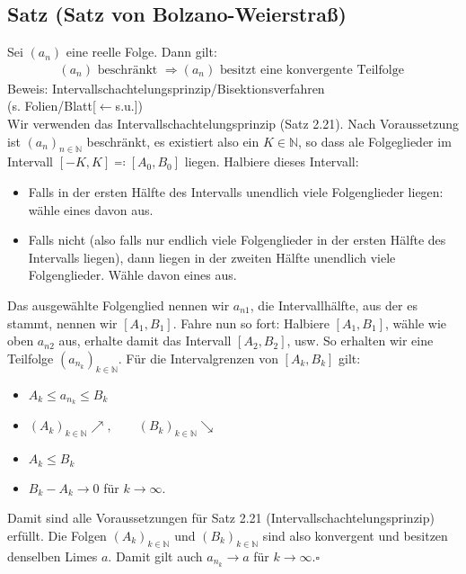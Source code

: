 \documentclass[12pt, titlepage]{article}
\newcommand{\N}{\mathds{N}}
\renewcommand{\>}{\rightarrow}
\renewcommand{\*}{\cdot}
\begin{document}
	\subsection{Satz (Satz von Bolzano-Weierstraß)}
	Sei $(a_n)$ eine reelle Folge. Dann gilt:
	\begin{align*}
		(a_n)\textrm{  beschränkt  }\Rightarrow(a_n)\textrm{  besitzt eine konvergente Teilfolge  }
	\end{align*}
	Beweis: Intervallschachtelungsprinzip/Bisektionsverfahren\\
	(s. Folien/Blatt[$\leftarrow$s.u.])
	\\
	Wir verwenden das Intervallschachtelungsprinzip (Satz 2.21). Nach Voraussetzung ist $(a_n)_{n\in\N}$ beschränkt, es existiert also ein $K\in\N$, so dass ale Folgeglieder im Intervall $[-K,K]\eqqcolon[A_0,B_0]$ liegen. Halbiere dieses Intervall:
	\begin{itemize}
		\item Falls in der ersten Hälfte des Intervalls unendlich viele Folgenglieder liegen: wähle eines davon aus.
		\item Falls nicht (also falls nur endlich viele Folgenglieder in der ersten Hälfte des Intervalls liegen), dann liegen in der zweiten Hälfte unendlich viele Folgenglieder. Wähle davon eines aus.
	\end{itemize}
	Das ausgewählte Folgenglied nennen wir $a_{n1}$, die Intervallhälfte, aus der es stammt, nennen wir $[A_1,B_1]$. Fahre nun so fort: Halbiere $[A_1,B_1]$, wähle wie oben $a_{n2}$ aus, erhalte damit das Intervall $[A_2,B_2]$, usw. So erhalten wir eine Teilfolge $(a_{n_k})_{k\in\N}$. Für die Intervalgrenzen von $[A_k,B_k]$ gilt:
	\begin{itemize}
		\item $A_k\leq a_{n_k}\leq B_k$
		\item $(A_k)_{k\in\N}\nearrow,\qquad(B_k)_{k\in\N}\searrow$
		\item $A_k\leq B_k$
		\item $B_k-A_k\> 0$ für $k\>\infty$. 
	\end{itemize}
	Damit sind alle Voraussetzungen für Satz 2.21 (Intervallschachtelungsprinzip) erfüllt. Die Folgen $(A_k)_{k\in\N}$ und $(B_k)_{k\in\N}$ sind also konvergent und besitzen denselben Limes $a$. Damit gilt auch $a_{n_k}\> a$ für $k\>\infty$.\hfill$\square$
\end{document}
